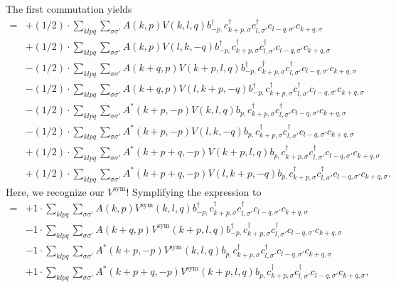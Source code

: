 The first commutation yields
\begin{align*}
	[\eta, H_\mathrm{C}] = 	&+(1/2) \cdot \sum_{ k l p q } \sum_{ \sigma \sigma' } A( k, p )  V( k, l, q )   b_{ -p, }^\dagger  c_{ k+p, \sigma }^\dagger  c_{ l, \sigma' }^\dagger  c_{ l-q, \sigma' } c_{ k+q, \sigma }  \\
	&+(1/2) \cdot \sum_{ k l p q } \sum_{ \sigma \sigma' } A( k, p )  V( l, k, -q )   b_{ -p, }^\dagger  c_{ k+p, \sigma }^\dagger  c_{ l, \sigma' }^\dagger  c_{ l-q, \sigma' } c_{ k+q, \sigma }  \\
	&-(1/2) \cdot \sum_{ k l p q } \sum_{ \sigma \sigma' } A( k+q, p )  V( k+p, l, q )   b_{ -p, }^\dagger  c_{ k+p, \sigma }^\dagger  c_{ l, \sigma' }^\dagger  c_{ l-q, \sigma' } c_{ k+q, \sigma }  \\
	&-(1/2) \cdot \sum_{ k l p q } \sum_{ \sigma \sigma' } A( k+q, p )  V( l, k+p, -q )   b_{ -p, }^\dagger  c_{ k+p, \sigma }^\dagger  c_{ l, \sigma' }^\dagger  c_{ l-q, \sigma' } c_{ k+q, \sigma }  \\
	&-(1/2) \cdot \sum_{ k l p q } \sum_{ \sigma \sigma' } A^*( k+p, -p )  V( k, l, q )   b_{ p, } c_{ k+p, \sigma }^\dagger  c_{ l, \sigma' }^\dagger  c_{ l-q, \sigma' } c_{ k+q, \sigma }  \\
	&-(1/2) \cdot \sum_{ k l p q } \sum_{ \sigma \sigma' } A^*( k+p, -p )  V( l, k, -q )   b_{ p, } c_{ k+p, \sigma }^\dagger  c_{ l, \sigma' }^\dagger  c_{ l-q, \sigma' } c_{ k+q, \sigma }  \\
	&+(1/2) \cdot \sum_{ k l p q } \sum_{ \sigma \sigma' } A^*( k+p+q, -p )  V( k+p, l, q )   b_{ p, } c_{ k+p, \sigma }^\dagger  c_{ l, \sigma' }^\dagger  c_{ l-q, \sigma' } c_{ k+q, \sigma }  \\
	&+(1/2) \cdot \sum_{ k l p q } \sum_{ \sigma \sigma' } A^*( k+p+q, -p )  V( l, k+p, -q )   b_{ p, } c_{ k+p, \sigma }^\dagger  c_{ l, \sigma' }^\dagger  c_{ l-q, \sigma' } c_{ k+q, \sigma } 
. \end{align*}
Here, we recognize our $V^\mathrm{sym}$! Symplifying the expression to
\begin{align*}
	[\eta, H_\mathrm{C}] = 	&+1 \cdot \sum_{ k l p q } \sum_{ \sigma \sigma' } A( k, p )  V^\mathrm{sym}( k, l, q )   b_{ -p, }^\dagger  c_{ k+p, \sigma }^\dagger  c_{ l, \sigma' }^\dagger  c_{ l-q, \sigma' } c_{ k+q, \sigma }  \\
	&-1 \cdot \sum_{ k l p q } \sum_{ \sigma \sigma' } A( k+q, p )  V^\mathrm{sym}( k+p, l, q )   b_{ -p, }^\dagger  c_{ k+p, \sigma }^\dagger  c_{ l, \sigma' }^\dagger  c_{ l-q, \sigma' } c_{ k+q, \sigma }  \\
	&-1 \cdot \sum_{ k l p q } \sum_{ \sigma \sigma' } A^*( k+p, -p )  V^\mathrm{sym}( k, l, q )   b_{ p, } c_{ k+p, \sigma }^\dagger  c_{ l, \sigma' }^\dagger  c_{ l-q, \sigma' } c_{ k+q, \sigma }  \\
	&+1 \cdot \sum_{ k l p q } \sum_{ \sigma \sigma' } A^*( k+p+q, -p )  V^\mathrm{sym}( k+p, l, q )   b_{ p, } c_{ k+p, \sigma }^\dagger  c_{ l, \sigma' }^\dagger  c_{ l-q, \sigma' } c_{ k+q, \sigma } 
, \end{align*}
